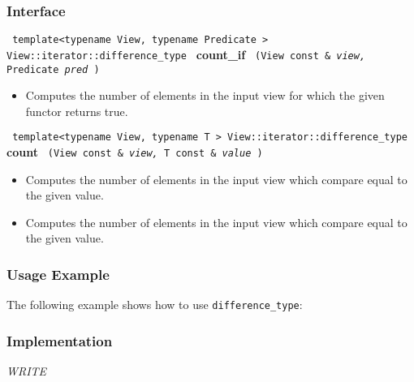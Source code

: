 \subsubsection{Interface} %

\noindent
\texttt{%
template<typename View, typename Predicate >
\newline
View::iterator::difference\_type 
}
\newline
\textbf{count\_if}%
\texttt{%
(View const \&
\textit{view,}%
Predicate 
\textit{pred}%
)
}

\begin{itemize}
\item
Computes the number of elements in the input view for which the given functor returns true. 
\end{itemize}

\noindent
\texttt{%
template<typename View, typename T >
\newline
View::iterator::difference\_type 
}
\newline
\textbf{count}%
\texttt{%
(View const \&
\textit{view,}%
T const \&
\textit{value}%
)
}
\vspace{0.4cm}
 
\begin{itemize}
\item
Computes the number of elements in the input view which compare equal to the given value. 
\item
Computes the number of elements in the input view which compare equal to the given value. 
\end{itemize}

\subsubsection{Usage Example} %

The following example shows how to use \texttt{difference\_type}:

 
\subsubsection{Implementation} %

\textit{WRITE}

